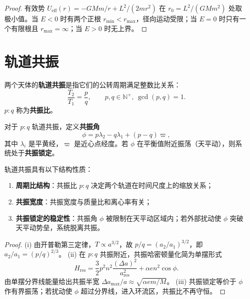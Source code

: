 \begin{proof}
有效势 \(U_{\text{eff}}(r)=-GMm/r+L^2/(2mr^2)\) 在 \(r_0=L^2/(GMm^2)\) 处取极小值。当 \(E<0\) 时有两个正根 \(r_{\min}<r_{\max}\)，径向运动受限；当 \(E=0\) 时只有一个有限根且 \(r_{\max}=\infty\)；当 \(E>0\) 时无上界。
\end{proof}

\section{轨道共振}
\label{sec:astro_resonance}

\begin{definition}[轨道共振]\label{def:orbital_resonance}
两个天体的\textbf{轨道共振}是指它们的公转周期满足整数比关系：
\[
\frac{T_2}{T_1}=\frac pq,\qquad p,q\in\mathbb N^+,\ \gcd(p,q)=1.
\]
\(p:q\) 称为\textbf{共振比}。
\end{definition}

\begin{definition}[共振角]\label{def:resonance_angle}
对于 \(p:q\) 轨道共振，定义\textbf{共振角}
\[
\phi=p\lambda_2-q\lambda_1+(p-q)\varpi,
\]
其中 \(\lambda_i\) 是平黄经，\(\varpi\) 是近心点经度。若 \(\phi\) 在平衡值附近振荡（天平动），则系统处于\textbf{共振锁定}。
\end{definition}

\begin{proposition}[共振的结构性质]\label{prop:resonance_structure}
轨道共振具有以下结构性质：
\begin{enumerate}[label=(\roman*)]
    \item \textbf{周期比结构}：共振比 \(p:q\) 决定两个轨道在时间尺度上的缩放关系；
    \item \textbf{共振宽度}：共振宽度与质量比和离心率有关；
    \item \textbf{共振锁定的稳定性}：共振角 \(\phi\) 被限制在天平动区域内；若外部扰动使 \(\phi\) 突破天平动势垒，系统脱离共振。
\end{enumerate}
\end{proposition}

\begin{proof}
(i) 由开普勒第三定律，\(T\propto a^{3/2}\)，故 \(p/q=(a_2/a_1)^{3/2}\)，即 \(a_2/a_1=(p/q)^{2/3}\)。
(ii) 在 \(p:q\) 共振附近，共振哈密顿量化简为单摆形式
\[
H_{\text{res}}=\frac32p^2n^2\frac{(\Delta a)^2}{a_{\text{res}}^2}+\alpha e n^2\cos\phi.
\]
由单摆分界线能量给出共振半宽 \(\Delta a_{\max}/a\approx\sqrt{\alpha e m/M}\)。
(iii) 共振锁定等价于 \(\phi\) 作有界振荡；若扰动使 \(\phi\) 超过分界线，进入环流区，共振比不再守恒。
\end{proof}

